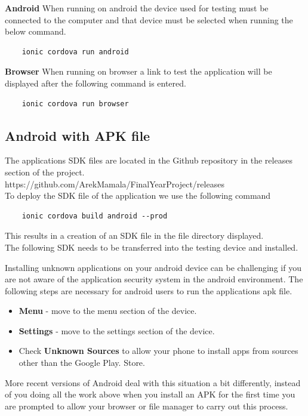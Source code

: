 \documentclass[a4paper,12pt]{report}
\begin{document}
\textbf{Android}   
When running on android the device used for testing must be connected to the computer and that device must be selected when running the below command.
\begin{lstlisting}
    ionic cordova run android
\end{lstlisting}

\textbf{Browser}   
When running on browser a link to test the application will be displayed after the following command is entered.
\begin{lstlisting}
    ionic cordova run browser
\end{lstlisting}


\subsection{Android with APK file}
The applications SDK files are located in the Github repository in the releases section of the project.
https://github.com/ArekMamala/FinalYearProject/releases\\

To deploy the SDK file of the application we use the following command
\begin{lstlisting}
    ionic cordova build android --prod 
\end{lstlisting}
This results in a creation of an SDK file in the file directory displayed.\\
The following SDK needs to be transferred into the testing device and installed.

Installing unknown applications on your android device can be challenging if you are not aware of the application security system in the android environment.
The following steps are necessary for android users to run the applications apk file.
\begin{itemize}
    \item \textbf{Menu} - move to the menu section of the device.
    \item \textbf{Settings} - move to the settings section of the device.
    \item Check \textbf{Unknown Sources} to allow your phone to install apps from sources other than the Google Play. Store.
\end{itemize}
More recent versions of Android deal with this situation a bit differently, instead of you doing all the work above when you install an APK for the first time you are prompted to allow your browser or file manager to carry out this process.\cite{apkFiles} 
\end{document}
